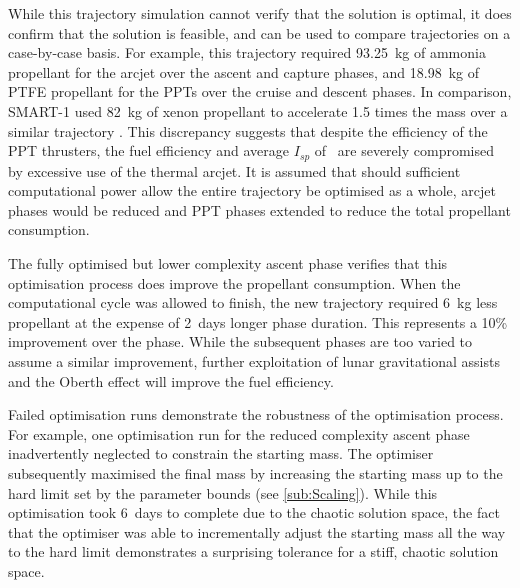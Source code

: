 While this trajectory simulation cannot verify that the solution is optimal, it does confirm that the solution is feasible, and can be used to compare trajectories on a case-by-case basis. For example, this trajectory required 93.25~kg of ammonia propellant for the arcjet over the ascent and capture phases, and 18.98~kg of PTFE propellant for the PPTs over the cruise and descent phases. In comparison, SMART-1 used 82~kg of xenon propellant to accelerate 1.5 times the mass over a similar trajectory \parencite{Estublier2007}. This discrepancy suggests that despite the efficiency of the PPT thrusters, the fuel efficiency and average $I_{sp}$ of \BW\ are severely compromised by excessive use of the thermal arcjet. It is assumed that should sufficient computational power allow the entire trajectory be optimised as a whole, arcjet phases would be reduced and PPT phases extended to reduce the total propellant consumption.



The fully optimised but lower complexity ascent phase verifies that this optimisation process does improve the propellant consumption. When the computational cycle was allowed to finish, the new trajectory required 6~kg less propellant at the expense of 2~days longer phase duration. This represents a 10\% improvement over the phase. While the subsequent phases are too varied to assume a similar improvement, further exploitation of lunar gravitational assists and the Oberth effect will improve the fuel efficiency.

Failed optimisation runs demonstrate the robustness of the optimisation process. For example, one optimisation run for the reduced complexity ascent phase inadvertently neglected to constrain the starting mass. The optimiser subsequently maximised the final mass by increasing the starting mass up to the hard limit set by the parameter bounds (see \autoref{sub:Scaling}). While this optimisation took 6~days to complete due to the chaotic solution space, the fact that the optimiser was able to incrementally adjust the starting mass all the way to the hard limit demonstrates a surprising tolerance for a stiff, chaotic solution space.

